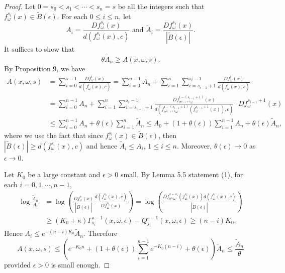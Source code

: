 \documentclass[11pt,oneside]{article}
\theoremstyle{plain}
\numberwithin{equation}{section}
\numberwithin{figure}{section}
\numberwithin{table}{section}
\begin{document}
\begin{proof}

Let $0 = s_0 < s_1 < \cdots < s_n = s$ be all the integers such that $f_{\omega}^{s_i} (x) \in \tilde B(\epsilon)$. For each $0 \leq i \leq n$, let 
\[
A_i = \frac{Df_{\omega}^{s_i} (x) }{d(f_{\omega}^{s_i} (x), c)} \mbox{ and } \tilde A_i = \frac{Df_{\omega}^{s_i} (x) }{|\tilde B(\epsilon)|}.
\]
It suffices to show that 
\[
\theta \tilde A_n \geq A(x, \omega, s).
\]
By Proposition 9, we have
\begin{align*}
A(x, \omega, s) & = \sum_{i=0}^{s-1} \frac{Df_{\omega}^i (x) }{d(f_{\omega}^i (x), c)} =  \sum_{i=0}^{n-1} A_n + \sum_{i=1}^{n} \sum_{i = s_{i-1}+1}^{s_i-1}  \frac{Df_{\omega}^i (x) }{d(f_{\omega}^i (x), c)} \\
& =\sum_{i=0}^{n-1} A_n + \sum_{i=1}^{n} \sum_{i = s_{i-1}+1}^{s_i-1}  \frac{Df_{\sigma^{s_{i-1}+1}\omega}^{i-(s_{i-1} +1)} (x) }{d(f_{\sigma^{s_{i-1}+1}\omega}^{i-(s_{i-1} +1)} (f_{\omega}^{s_{i-1} +1}(x)), c)}  \cdot Df_{\omega}^{s_{i-1} +1} (x) \\
& \leq  \sum_{i=0}^{n-1} A_n  + \theta(\epsilon) \sum_{i=1}^{n}  \tilde A_n \leq A_0 + (1 + \theta (\epsilon)) \sum_{i=1}^{n-1} A_n + \theta(\epsilon) \tilde A_n,
\end{align*}
where we use the fact that since $f_{\omega}^{s_i} (x) \in \tilde B(\epsilon)$, then $|\tilde B(\epsilon)| \geq d(f_{\omega}^{s_i} (x), c)$ and hence $\tilde A_i \leq A_i$, $1 \leq i \leq n$. Moreover, $\theta(\epsilon) \to 0$ as $\epsilon \to 0$.


Let $K_0$ be a large constant and $\epsilon > 0$ small. By Lemma 5.5 statement (1), for each $i = 0, 1, \cdots, n-1$, 
\begin{align*}
\log \frac{\tilde A_n}{A_i} &= \log \left( \frac{Df_{\omega}^{s} (x) }{|\tilde B(\epsilon)|} \frac{d(f_{\omega}^{s_i} (x), c)}{Df_{\omega}^{s_i} (x) } \right)  = \log \left( \frac{  Df_{\sigma^{s_i} \omega}^{s - s_i} ( f_{\omega}^{s_i} (x)) d(f_{\omega}^{s_i} (x), c) }{|\tilde B(\epsilon)|} \right) \\
& \geq (K_0 + \kappa) \Gamma_{s_i}^{s-1} (x, \omega, \epsilon) - Q_{s_i}^{s-1} (x, \omega, \epsilon) \geq (n - i) K_0.
\end{align*}
Hence $A_i \leq e^{-(n-i) K_0} \tilde A_n$. Therefore
\[
A(x, \omega, s) \leq  \left( e^{- K_0 n} +(1+\theta(\epsilon)) \sum_{i=1}^{n-1} e^{-K_0(n-i)} + \theta(\epsilon)  \right) \tilde A_n \leq \frac{\tilde A_n}{\theta}
\]
provided $\epsilon > 0$ is small enough.


\end{proof}
\end{document}
